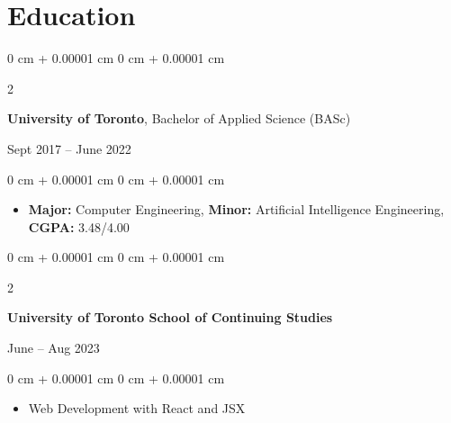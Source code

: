 \documentclass[10pt, letterpaper]{article}
\newenvironment{highlights}{
    \begin{itemize}[
        topsep=0.10 cm,
        parsep=0.10 cm,
        partopsep=0pt,
        itemsep=0pt,
        leftmargin=0 cm + 10pt
    ]
}{
    \end{itemize}
} %
\newenvironment{onecolentry}{
    \begin{adjustwidth}{
        0 cm + 0.00001 cm
    }{
        0 cm + 0.00001 cm
    }
}{
    \end{adjustwidth}
} %
\newenvironment{twocolentry}[2][]{
    \onecolentry
    \def\secondColumn{#2}
    \setcolumnwidth{\fill, 4 cm}
    \begin{paracol}{2}
}{
    \switchcolumn \raggedleft \secondColumn
    \end{paracol}
    \endonecolentry
} %
\begin{document}
    \section{Education}
        \begin{twocolentry}{Sept 2017 -- June 2022}
            \textbf{University of Toronto}, Bachelor of Applied Science (BASc)
        \end{twocolentry}
        \vspace{0.10 cm}
        \begin{onecolentry}
            \begin{highlights}
                \item \textbf{Major:} Computer Engineering, \textbf{Minor:} Artificial Intelligence Engineering,  \textbf{CGPA:} 3.48/4.00
            \end{highlights}
        \end{onecolentry}
        \vspace{0.5 cm}
        \begin{twocolentry}{June -- Aug 2023}
            \textbf{University of Toronto School of Continuing Studies}
        \end{twocolentry}
        \vspace{0.10 cm}
        \begin{onecolentry}
            \begin{highlights}
                \item Web Development with React and JSX
            \end{highlights}
        \end{onecolentry}
    
\end{document}
